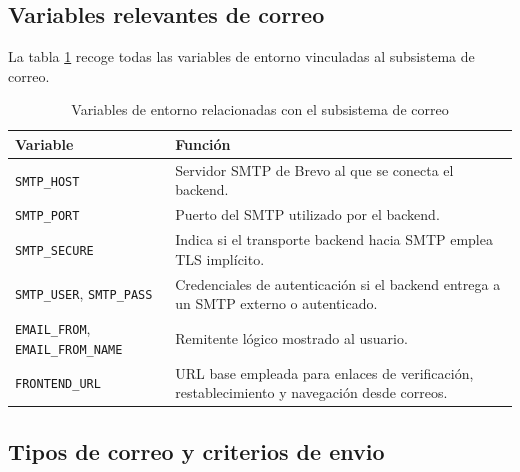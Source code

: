 \documentclass[11pt, a4paper]{article}
\begin{document}
\subsection{Variables relevantes de correo}

La tabla \ref{tab:vars-email} recoge todas las variables de entorno vinculadas al subsistema de correo.

\begin{table}[H]
\centering
\small
\renewcommand{\arraystretch}{1.4}
\begin{tabular}{@{}lp{8cm}@{}}
\toprule
\textbf{Variable} & \textbf{Funci\'{o}n} \\
\midrule
\texttt{SMTP\_HOST} & Servidor SMTP de Brevo al que se conecta el backend. \\
\texttt{SMTP\_PORT} & Puerto del SMTP utilizado por el backend. \\
\texttt{SMTP\_SECURE} & Indica si el transporte backend hacia SMTP emplea TLS impl\'{i}cito. \\
\texttt{SMTP\_USER}, \texttt{SMTP\_PASS} & Credenciales de autenticaci\'{o}n si el backend entrega a un SMTP externo o autenticado. \\
\texttt{EMAIL\_FROM}, \texttt{EMAIL\_FROM\_NAME} & Remitente l\'{o}gico mostrado al usuario. \\
\texttt{FRONTEND\_URL} & URL base empleada para enlaces de verificaci\'{o}n, restablecimiento y navegaci\'{o}n desde correos. \\
\bottomrule
\end{tabular}
\caption{Variables de entorno relacionadas con el subsistema de correo}
\label{tab:vars-email}
\end{table}

\subsection{Tipos de correo y criterios de envio}
\end{document}
